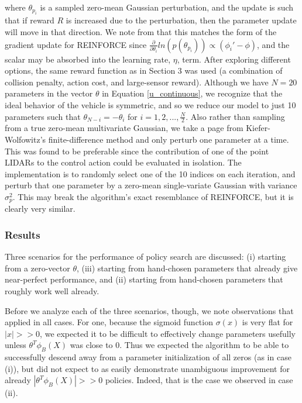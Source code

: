 \documentclass{article}
\begin{document}
where $\theta_{p_i}$ is a sampled zero-mean Gaussian perturbation, and the update is such that if reward $R$ is increased due to the perturbation, then the parameter update will move in that direction.  We note from  that this matches the form of the gradient update for REINFORCE since $\frac{\partial}{\partial \theta_i} ln (p(\theta_{p_i} )) \propto (\phi_i' -\phi)$, and the scalar may be absorbed into the learning rate, $\eta$, term.  After exploring different options, the same reward function as in Section 3 was used (a combination of collision penalty, action cost, and large-sensor reward).  Although we have $N=20$ parameters in the vector $\theta$ in Equation \ref{u_continuous}, we recognize that the ideal behavior of the vehicle is symmetric, and so we reduce our model to just 10 parameters such that $\theta_{N-i} = - \theta_{i} $ for $i = 1,2,..., \frac{N}{2}$.  Also rather than sampling from a true zero-mean multivariate Gaussian, we take a page from Kiefer-Wolfowitz's finite-difference method and only perturb one parameter at a time.  This was found to be preferable since the contribution of one of the point LIDARs to the control action could be evaluated in isolation.  The implementation is to randomly select one of the 10 indices on each iteration, and perturb that one parameter by a zero-mean single-variate Gaussian with variance $\sigma_p^2$.  This may break the algorithm's exact resemblance of REINFORCE, but it is clearly very similar.

\subsubsection{Results}

Three scenarios for the performance of policy search are discussed: (i) starting from a zero-vector $\theta$, (iii) starting from hand-chosen parameters that already give near-perfect performance, and (ii) starting from hand-chosen parameters that roughly work well already.

Before we analyze each of the three scenarios, though, we note observations that applied in all cases.  For one, because the sigmoid function $\sigma(x)$ is very flat for $|x|>>0$, we expected it to be difficult to effectively change parameters usefully unless $\theta^T \phi_B(X)$ was close to 0.  Thus we expected the algorithm to be able to successfully descend away from a parameter initialization of all zeros (as in case (i)), but did not expect to as easily demonstrate unambiguous improvement for already $|\theta^T \phi_B(X)| >> 0$ policies.  Indeed, that is the case we observed in case (ii).
\end{document}
